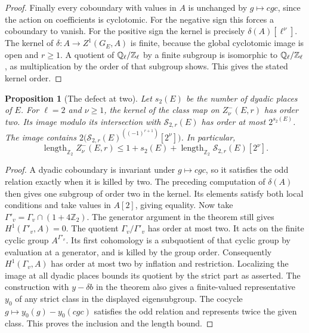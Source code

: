 \documentclass[a4paper,11pt]{article}
\newtheorem{proposition}{Proposition}[section]
\theoremstyle{definition}
\theoremstyle{remark}
\newcommand{\ZZ}{\mathbb Z}\newcommand{\ord}{\operatorname{ord}}
\newcommand{\len}{\operatorname{length}}\newcommand{\Res}{\operatorname*{Res}}
\numberwithin{equation}{section}
\begin{document}
\begin{proof}
Finally every coboundary with values in \(A\) is unchanged by
\(g\mapsto cgc\), since the action on coefficients is cyclotomic.
For the negative sign this forces a coboundary to vanish. For the
positive sign the kernel is precisely \(\delta(A)[\ell^\nu]\).
The kernel of \(\delta:A\to Z^1(G_E,A)\) is finite, because
the global cyclotomic image is open and \(r\ge1\). A quotient
of \(\QQ_\ell/\ZZ_\ell\) by a finite subgroup is isomorphic to
\(\QQ_\ell/\ZZ_\ell\), as multiplication by the order of that
subgroup shows. This gives the stated kernel order.
\end{proof}

\begin{proposition}[The defect at two]
\leavevmode\label{prop:dyadicodd675}
Let \(s_2(E)\) be the number of dyadic places of \(E\).
For \(\ell=2\) and \(\nu\ge1\), the kernel of the class map on
\(Z^-_\nu(E,r)\) has order two. Its image modulo its intersection
with \(\mathcal S_{2,r}(E)\) has order at most \(2^{s_2(E)}\).
The image contains
\(2\bigl(\mathcal S_{2,r}(E)^{((-1)^{r+1})}[2^\nu]\bigr)\).
In particular,
\[
 \len_{\ZZ_2} Z^-_\nu(E,r)
      \le 1+s_2(E)+\len_{\ZZ_2}\mathcal S_{2,r}(E)[2^\nu].
\]
\end{proposition}
\begin{proof}
A dyadic coboundary is invariant under \(g\mapsto cgc\), so it
satisfies the odd relation exactly when it is killed by two.
The preceding computation of \(\delta(A)\) then gives one
subgroup of order two in the kernel. Its elements satisfy both
local conditions and take values in \(A[2]\), giving equality.
Now take \(\Gamma'_v=\Gamma_v\cap(1+4\ZZ_2)\). The generator
argument in the theorem still gives \(H^1(\Gamma'_v,A)=0\).
The quotient \(\Gamma_v/\Gamma'_v\) has order at most two.
It acts on the finite cyclic group \(A^{\Gamma'_v}\).
Its first cohomology is a subquotient of that cyclic group by
evaluation at a generator, and is killed by the group order.
Consequently \(H^1(\Gamma_v,A)\) has order at most two by
inflation and restriction. Localizing the image at all dyadic
places bounds its quotient by the strict part as asserted.
The construction with \(y-\delta b\) in the theorem also gives
a finite-valued representative \(y_0\) of any strict class in
the displayed eigensubgroup. The cocycle
\(g\mapsto y_0(g)-y_0(cgc)\) satisfies the odd relation
and represents twice the given class. This proves the inclusion
and the length bound.
\end{proof}
\end{document}

